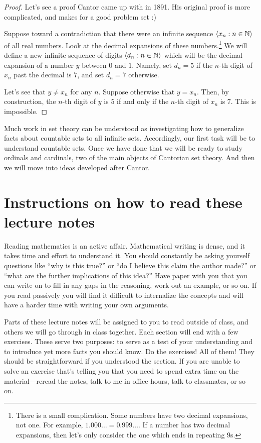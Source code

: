 \documentclass[10pt]{amsart}
\begin{document}
\begin{proof}
Let's see a proof Cantor came up with in 1891. His original proof is more complicated, and makes for a good problem set :)

Suppose toward a contradiction that there were an infinite sequence ${\left\langle x_n : n \in \mathbb{N} \right\rangle}$ of all real numbers. Look at the decimal expansions of these numbers.\footnote{There is a small complication. Some numbers have two decimal expansions, not one. For example, $1.000\ldots = 0.999\ldots$. If a number has two decimal expansions, then let's only consider the one which ends in repeating $9$s.}
We will define a new infinite sequence of digits ${\left\langle d_n : n \in \mathbb{N} \right\rangle}$ which will be the decimal expansion of a number $y$ between $0$ and $1$. Namely, set $d_n = 5$ if the $n$-th digit of $x_n$ past the decimal is $7$, and set $d_n = 7$ otherwise.

Let's see that $y \ne x_n$ for any $n$. Suppose otherwise that $y = x_n$. Then, by construction, the $n$-th digit of $y$ is $5$ if and only if the $n$-th digit of $x_n$ is $7$. This is impossible.
\end{proof}

Much work in set theory can be understood as investigating how to generalize facts about countable sets to all infinite sets. Accordingly, our first task will be to understand countable sets. Once we have done that we will be ready to study ordinals and cardinals, two of the main objects of Cantorian set theory. And then we will move into ideas developed after Cantor.


\section*{Instructions on how to read these lecture notes}

Reading mathematics is an active affair. Mathematical writing is dense, and it takes time and effort to understand it. You should constantly be asking yourself questions like ``why is this true?'' or ``do I believe this claim the author made?'' or ``what are the further implications of this idea?'' Have paper with you that you can write on to fill in any gaps in the reasoning, work out an example, or so on.  If you read passively you will find it difficult to internalize the concepts and will have a harder time with writing your own arguments.

Parts of these lecture notes will be assigned to you to read outside of class, and others we will go through in class together. Each section will end with a few exercises. These serve two purposes: to serve as a test of your understanding and to introduce yet more facts you should know. Do the exercises! All of them! They should be straightforward if you understood the section. If you are unable to solve an exercise that's telling you that you need to spend extra time on the material---reread the notes, talk to me in office hours, talk to classmates, or so on.
\end{document}
